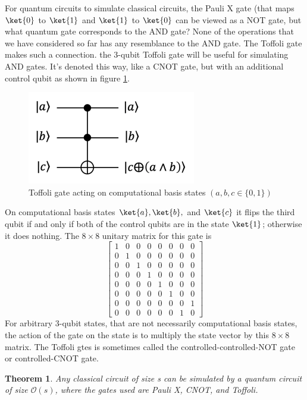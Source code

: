 \documentclass[12pt, oneside]{book}
\newtheorem{theorem}{Theorem}[section]
\theoremstyle{definition}
\theoremstyle{definition}
\theoremstyle{remark}
\begin{document}
For quantum circuits to simulate classical circuits, the Pauli X gate (that maps $\ket{0}$ to $\ket{1}$ and $\ket{1}$ to $\ket{0}$ can be viewed as a NOT gate, but what quantum gate corresponds to the AND gate? None of the operations that we have considered so far has any resemblance to the AND gate. The Toffoli gate makes such a connection.
the 3-qubit Toffoli gate will be useful for simulating AND gates. It's denoted this way, like a CNOT gate, but with an additional control qubit as shown in figure \ref{fig:toffoli_and}.
\begin{figure}[H]
    \centering
    \includegraphics[width=0.5\linewidth]{../images/Toffoligate.png}
    \caption{Toffoli gate acting on computational basis states $(a,b,c \in \{0,1\})$}
    \label{fig:toffoli_and}
\end{figure}
On computational basis states $\ket{a},\ket{b},$ and $\ket{c}$ it flips the third qubit if and only if both of the control qubits are in the state $\ket{1}$; otherwise it does nothing. The $8 \times 8$ unitary matrix for this gate is
\[
\begin{bmatrix} 1 & 0 & 0 & 0& 0 & 0 & 0 & 0 \\
0 & 1 & 0 & 0& 0 & 0 & 0 & 0 \\
0 & 0 & 1 & 0& 0 & 0 & 0 & 0 \\
0 & 0 & 0 & 1& 0 & 0 & 0 & 0 \\
0 & 0 & 0 & 0& 1 & 0 & 0 & 0 \\
0 & 0 & 0 & 0& 0 & 1 & 0 & 0 \\
0 & 0 & 0 & 0& 0 & 0 & 0 & 1 \\
0 & 0 & 0 & 0& 0 & 0 & 1 & 0 
\end{bmatrix}
\]
For arbitrary 3-qubit states, that are not necessarily computational basis states, the action of the gate on the state is to multiply the state vector by this $8 \times 8$ matrix. The Toffoli gtes is sometimes called the controlled-controlled-NOT gate or controlled-CNOT gate.
\begin{theorem}
    Any classical circuit of size s can be simulated by a quantum circuit of size $\mathcal{O}(s)$, where the gates used are Pauli X, CNOT, and Toffoli.
\end{theorem}
\end{document}
